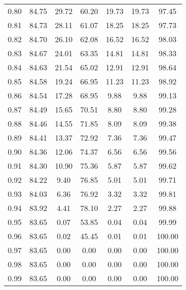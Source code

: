 \begin{tabular}{|c|c|c|c|c|c|c|}
      0.80 &     84.75 &     29.72 &      60.20 &   19.73 &      19.73 &         97.45 \\
      0.81 &     84.73 &     28.11 &      61.07 &   18.25 &      18.25 &         97.73 \\
      0.82 &     84.70 &     26.10 &      62.08 &   16.52 &      16.52 &         98.03 \\
      0.83 &     84.67 &     24.01 &      63.35 &   14.81 &      14.81 &         98.33 \\
      0.84 &     84.63 &     21.54 &      65.02 &   12.91 &      12.91 &         98.64 \\
      0.85 &     84.58 &     19.24 &      66.95 &   11.23 &      11.23 &         98.92 \\
      0.86 &     84.54 &     17.28 &      68.95 &    9.88 &       9.88 &         99.13 \\
      0.87 &     84.49 &     15.65 &      70.51 &    8.80 &       8.80 &         99.28 \\
      0.88 &     84.46 &     14.55 &      71.85 &    8.09 &       8.09 &         99.38 \\
      0.89 &     84.41 &     13.37 &      72.92 &    7.36 &       7.36 &         99.47 \\
      0.90 &     84.36 &     12.06 &      74.37 &    6.56 &       6.56 &         99.56 \\
      0.91 &     84.30 &     10.90 &      75.36 &    5.87 &       5.87 &         99.62 \\
      0.92 &     84.22 &      9.40 &      76.85 &    5.01 &       5.01 &         99.71 \\
      0.93 &     84.03 &      6.36 &      76.92 &    3.32 &       3.32 &         99.81 \\
      0.94 &     83.92 &      4.41 &      78.10 &    2.27 &       2.27 &         99.88 \\
      0.95 &     83.65 &      0.07 &      53.85 &    0.04 &       0.04 &         99.99 \\
      0.96 &     83.65 &      0.02 &      45.45 &    0.01 &       0.01 &        100.00 \\
      0.97 &     83.65 &      0.00 &       0.00 &    0.00 &       0.00 &        100.00 \\
      0.98 &     83.65 &      0.00 &       0.00 &    0.00 &       0.00 &        100.00 \\
      0.99 &     83.65 &      0.00 &       0.00 &    0.00 &       0.00 &        100.00 \\
\bottomrule
\end{tabular}
